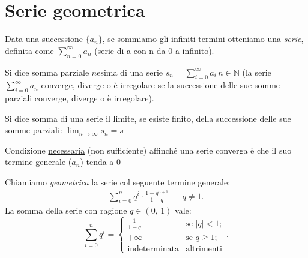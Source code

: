     \section{Serie geometrica}
    \begin{defn}[Serie]
        Data una successione $\{a_{n}\}$, se sommiamo gli infiniti termini otteniamo una \emph{serie}, definita come $\sum_{n=0}^{\infty} a_n$ (serie di a con n da 0 a infinito).

        Si dice somma parziale $n$\nbdash esima di una serie $s_{n}=\sum_{i=0}^{\infty} a_i\,n \in \mathbb{N}$ (la serie $\sum_{i=0}^{\infty} a_n$ converge, diverge o è irregolare se la successione delle sue somme parziali converge, diverge o è irregolare).

        Si dice somma di una serie il limite, se esiste finito, della successione delle sue somme parziali: $\lim_{n \to \infty} s_n = s$

        Condizione \underline{necessaria} (non sufficiente) affinché una serie converga è che il suo termine generale ($a_n$) tenda a 0
    \end{defn}
    \begin{defn}\label{defn:Serie_geometrica}
        Chiamiamo \emph{geometrica} la serie col seguente termine generale:
        \begin{align*}
            \sum_{i=0}^{n} q^{i} \cdot \frac{1 - q^{n+1}}{1 - q} & &q\neq 1
        .\end{align*}
        La somma della serie con ragione $q \in (0,\,1)$ vale: \[
            \sum_{i=0}^{n} q^{i} = \begin{cases}
                \frac{1}{1-q} & \text{se $|q| < 1$}; \\
                +\infty & \text{se $q \geq 1$}; \\
                \text{indeterminata} & \text{altrimenti}
            \end{cases}
        .\] 
    \end{defn}

